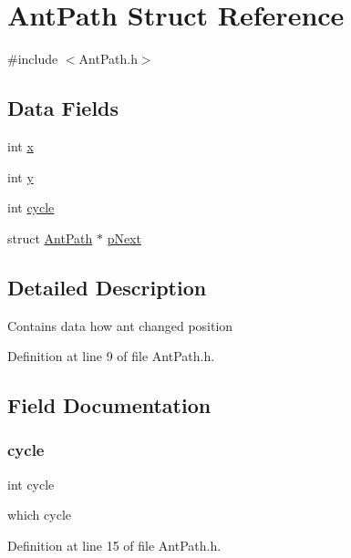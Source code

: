 \hypertarget{struct_ant_path}{}\section{Ant\+Path Struct Reference}
\label{struct_ant_path}


{\ttfamily \#include $<$Ant\+Path.\+h$>$}

\subsection*{Data Fields}
\begin{DoxyCompactItemize}
\item 
int \mbox{\hyperlink{struct_ant_path_a6150e0515f7202e2fb518f7206ed97dc}{x}}
\item 
int \mbox{\hyperlink{struct_ant_path_a0a2f84ed7838f07779ae24c5a9086d33}{y}}
\item 
int \mbox{\hyperlink{struct_ant_path_a1f4871d45089b039d95d3832dd123827}{cycle}}
\item 
struct \mbox{\hyperlink{struct_ant_path}{Ant\+Path}} $\ast$ \mbox{\hyperlink{struct_ant_path_a9872e2b89442f861d58fde795b765e0e}{p\+Next}}
\end{DoxyCompactItemize}


\subsection{Detailed Description}
Contains data how ant changed position 

Definition at line 9 of file Ant\+Path.\+h.



\subsection{Field Documentation}
\mbox{\label{struct_ant_path_a1f4871d45089b039d95d3832dd123827}} 
\subsubsection{\texorpdfstring{cycle}{cycle}}
{\footnotesize\ttfamily int cycle}

which cycle 

Definition at line 15 of file Ant\+Path.\+h.

\mbox{\label{struct_ant_path_a9872e2b89442f861d58fde795b765e0e}} 
